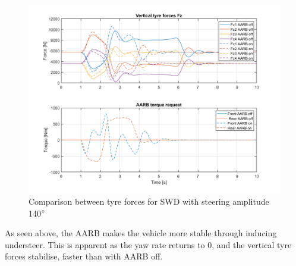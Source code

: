 \begin{figure}[H]
\begin{minipage}[b]{0.9\linewidth}
    \includegraphics[width=\textwidth]{Figures/4_4_Fx_MxReq.png}
    \caption{Comparison between tyre forces for SWD with steering amplitude 140$\degree$}
\end{minipage}
\end{figure}

As seen above, the AARB makes the vehicle more stable through inducing understeer. This is apparent as the yaw rate returns to 0, and the vertical tyre forces stabilise, faster than with AARB off. 




